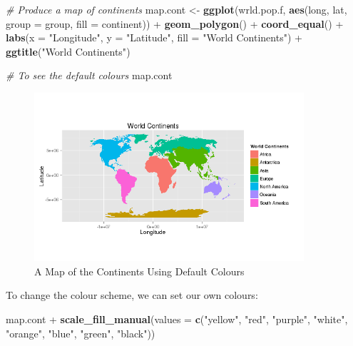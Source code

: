 \documentclass[]{article}
\newenvironment{Shaded}{}{}
\newcommand{\KeywordTok}[1]{\textcolor[rgb]{0.00,0.44,0.13}{\textbf{{#1}}}}
\newcommand{\DataTypeTok}[1]{\textcolor[rgb]{0.56,0.13,0.00}{{#1}}}
\newcommand{\StringTok}[1]{\textcolor[rgb]{0.25,0.44,0.63}{{#1}}}
\newcommand{\CommentTok}[1]{\textcolor[rgb]{0.38,0.63,0.69}{\textit{{#1}}}}
\newcommand{\NormalTok}[1]{{#1}}
\let\Oldincludegraphics\includegraphics
\renewcommand{\includegraphics}[1]{\Oldincludegraphics[width=10cm]{#1}}
\begin{document}
\begin{Shaded}
\begin{Highlighting}[]
\CommentTok{# Produce a map of continents}
\NormalTok{map.cont <- }\KeywordTok{ggplot}\NormalTok{(wrld.pop.f, }\KeywordTok{aes}\NormalTok{(long, lat, }\DataTypeTok{group =} \NormalTok{group, }\DataTypeTok{fill =} \NormalTok{continent)) + }
    \KeywordTok{geom_polygon}\NormalTok{() + }\KeywordTok{coord_equal}\NormalTok{() + }\KeywordTok{labs}\NormalTok{(}\DataTypeTok{x =} \StringTok{"Longitude"}\NormalTok{, }\DataTypeTok{y =} \StringTok{"Latitude"}\NormalTok{, }\DataTypeTok{fill =} \StringTok{"World Continents"}\NormalTok{) + }
    \KeywordTok{ggtitle}\NormalTok{(}\StringTok{"World Continents"}\NormalTok{)}

\CommentTok{# To see the default colours}
\NormalTok{map.cont}
\end{Highlighting}
\end{Shaded}

\begin{figure}[htbp]
\centering
\includegraphics{figure/A_Map_of_the_Continents_Using_Default_Colours.png}
\caption{A Map of the Continents Using Default Colours}
\end{figure}

To change the colour scheme, we can set our own colours:

\begin{Shaded}
\begin{Highlighting}[]
\NormalTok{map.cont + }\KeywordTok{scale_fill_manual}\NormalTok{(}\DataTypeTok{values =} \KeywordTok{c}\NormalTok{(}\StringTok{"yellow"}\NormalTok{, }\StringTok{"red"}\NormalTok{, }\StringTok{"purple"}\NormalTok{, }\StringTok{"white"}\NormalTok{, }
    \StringTok{"orange"}\NormalTok{, }\StringTok{"blue"}\NormalTok{, }\StringTok{"green"}\NormalTok{, }\StringTok{"black"}\NormalTok{))}
\end{Highlighting}
\end{Shaded}
\end{document}
